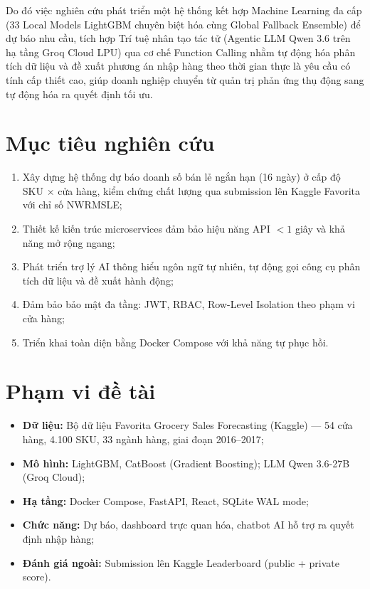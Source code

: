 \documentclass[12pt,a4paper]{report}
\begin{document}
Do đó việc nghiên cứu phát triển một hệ thống kết hợp Machine Learning đa cấp (33 Local Models LightGBM chuyên biệt hóa cùng Global Fallback Ensemble) để dự báo nhu cầu, tích hợp Trí tuệ nhân tạo tác tử (Agentic LLM Qwen 3.6 trên hạ tầng Groq Cloud LPU) qua cơ chế Function Calling nhằm tự động hóa phân tích dữ liệu và đề xuất phương án nhập hàng theo thời gian thực là yêu cầu có tính cấp thiết cao, giúp doanh nghiệp chuyển từ quản trị phản ứng thụ động sang tự động hóa ra quyết định tối ưu.

\section*{Mục tiêu nghiên cứu}

\begin{enumerate}
    \item Xây dựng hệ thống dự báo doanh số bán lẻ ngắn hạn (16 ngày) ở cấp độ SKU $\times$ cửa hàng, kiểm chứng chất lượng qua submission lên Kaggle Favorita với chỉ số NWRMSLE;
    \item Thiết kế kiến trúc microservices đảm bảo hiệu năng API $< 1$ giây và khả năng mở rộng ngang;
    \item Phát triển trợ lý AI thông hiểu ngôn ngữ tự nhiên, tự động gọi công cụ phân tích dữ liệu và đề xuất hành động;
    \item Đảm bảo bảo mật đa tầng: JWT, RBAC, Row-Level Isolation theo phạm vi cửa hàng;
    \item Triển khai toàn diện bằng Docker Compose với khả năng tự phục hồi.
\end{enumerate}

\section*{Phạm vi đề tài}

\begin{itemize}
    \item \textbf{Dữ liệu:} Bộ dữ liệu Favorita Grocery Sales Forecasting (Kaggle) --- 54 cửa hàng, 4.100 SKU, 33 ngành hàng, giai đoạn 2016--2017;
    \item \textbf{Mô hình:} LightGBM, CatBoost (Gradient Boosting); LLM Qwen 3.6-27B (Groq Cloud);
    \item \textbf{Hạ tầng:} Docker Compose, FastAPI, React, SQLite WAL mode;
    \item \textbf{Chức năng:} Dự báo, dashboard trực quan hóa, chatbot AI hỗ trợ ra quyết định nhập hàng;
    \item \textbf{Đánh giá ngoài:} Submission lên Kaggle Leaderboard (public + private score).
\end{itemize}
\end{document}
